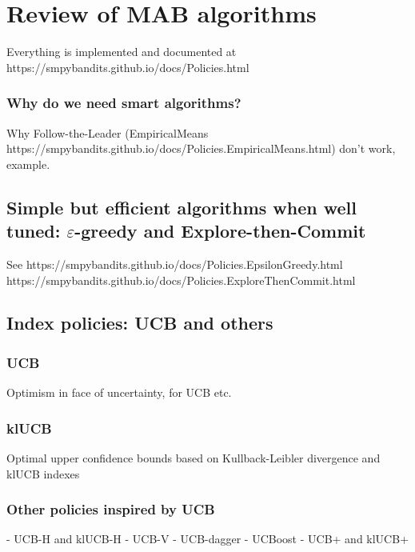 \section{Review of MAB algorithms}
\label{sec:2:famousMABalgorithms}

Everything is implemented and documented at
https://smpybandits.github.io/docs/Policies.html


\subsubsection{Why do we need smart algorithms?}
Why Follow-the-Leader (EmpiricalMeans https://smpybandits.github.io/docs/Policies.EmpiricalMeans.html) don't work, example.

\subsection{Simple but efficient algorithms when well tuned: $\varepsilon$-greedy and Explore-then-Commit}

See
https://smpybandits.github.io/docs/Policies.EpsilonGreedy.html
https://smpybandits.github.io/docs/Policies.ExploreThenCommit.html


\subsection{Index policies: UCB and others}

\subsubsection{UCB}
Optimism in face of uncertainty, for UCB etc.


\subsubsection{klUCB}
Optimal upper confidence bounds based on Kullback-Leibler divergence and klUCB indexes

\subsubsection{Other policies inspired by UCB}

- UCB-H and klUCB-H
- UCB-V
- UCB-dagger
- UCBoost
- UCB+ and klUCB+


